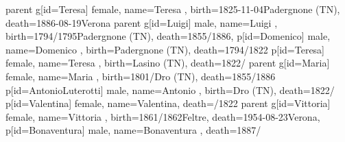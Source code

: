 \documentclass{article}
\begin{document}
\begin{midpage}
\begin{center}
\begin{genealogypicture}
{{{{{{{{                            }
                        }
                    }
                    parent{
                        g[id=Teresa]{
                            female,
                            name={Teresa },
                            birth={1825-11-04}{Padergnone (TN)},
                            death={1886-08-19}{Verona}
                        }
                        parent{
                            g[id=Luigi]{
                                male,
                                name={Luigi },
                                birth={1794/1795}{Padergnone (TN)},
                                death={1855/1886}{},
                            }
                            p[id=Domenico]{
                                male,
                                name={Domenico },
                                birth={Padergnone (TN)}{},
                                death={1794/1822}{}
                            }
                            p[id=Teresa]{
                                female,
                                name={Teresa },
                                birth={Lasino (TN)}{},
                                death={1822/}{}
                            }
                        }
                        parent{
                            g[id=Maria]{
                                female,
                                name={Maria },
                                birth={1801/}{Dro (TN)},
                                death={1855/1886}{}
                            }
                            p[id=AntonioLuterotti]{
                                male,
                                name={Antonio },
                                birth={Dro (TN)}{},
                                death={1822/}{}
                            }
                            p[id=Valentina]{
                                female,
                                name={Valentina},
                                death={/1822}{}
                            }
                        }
                    }
                }
                parent{
                    g[id=Vittoria]{
                        female,
                        name={Vittoria },
                        birth={1861/1862}{Feltre},
                        death={1954-08-23}{Verona},
                    }
                    p[id=Bonaventura]{
                        male,
                        name={Bonaventura },
                        death={1887/}{}
}}}}}}
\end{genealogypicture}
\end{center}
\end{midpage}
\end{document}
